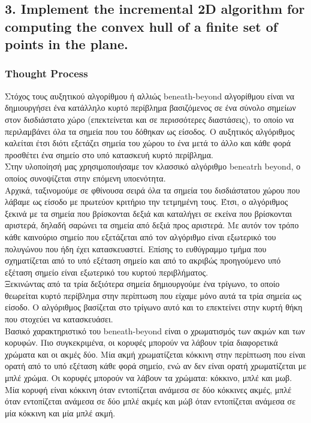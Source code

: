 \documentclass[12pt]{article}
\begin{document}
\pagebreak

\subsection*{3. Implement the incremental 2D algorithm for computing the convex hull of a
    finite set of points in the plane.}

\subsubsection*{Thought Process}

Στόχος τους αυξητικού αλγορίθμου ή αλλιώς beneath-beyond αλγορίθμου είναι να δημιουργήσει ένα κατάλληλο κυρτό περίβλημα βασιζόμενος σε ένα σύνολο σημείων στον δισδιάστατο χώρο (επεκτείνεται και σε περισσότερες διαστάσεις), το οποίο να περιλαμβάνει όλα τα σημεία που του δόθηκαν ως είσοδος. Ο αυξητικός αλγόριθμος καλείται έτσι διότι εξετάζει σημεία του χώρου το ένα μετά το άλλο και κάθε φορά προσθέτει ένα σημείο στο υπό κατασκευή κυρτό περίβλημα. \\

Στην υλοποίησή μας χρησιμοποιήσαμε τον κλασσικό αλγόριθμο beneatrh beyond, ο οποίος συνοψίζεται στην επόμενη υποενότητα. \\

Αρχικά, ταξινομούμε σε φθίνουσα σειρά όλα τα σημεία του δισδιάστατου χώρου που λάβαμε ως είσοδο με πρωτεύον κριτήριο την τετμημένη τους. Έτσι, ο αλγόριθμος ξεκινά με τα σημεία που βρίσκονται δεξιά και καταλήγει σε εκείνα που βρίσκονται αριστερά, δηλαδή σαρώνει τα σημεία από δεξιά προς αριστερά. Με αυτόν τον τρόπο κάθε καινούριο σημείο που εξετάζεται από τον αλγόριθμο είναι εξωτερικό του πολυγώνου που ήδη έχει κατασκευαστεί. Επίσης το ευθύγραμμο τμήμα που σχηματίζεται από το υπό εξέταση σημείο και από το ακριβώς προηγούμενο υπό εξέταση σημείο είναι εξωτερικό του κυρτού περιβλήματος. \\

Ξεκινώντας από τα τρία δεξιότερα σημεία δημιουργούμε ένα τρίγωνο, το οποίο θεωρείται κυρτό περίβλημα στην περίπτωση που είχαμε μόνο αυτά τα τρία σημεία ως είσοδο. Ο αλγόριθμος βασίζεται στο τρίγωνο αυτό και το επεκτείνει στην κυρτή θήκη που στοχεύει να κατασκευάσει. \\

Βασικό χαρακτηριστικό του beneath-beyond είναι ο χρωματισμός των ακμών και των κορυφών. Πιο συγκεκριμένα, οι κορυφές μπορούν να λάβουν τρία διαφορετικά χρώματα και οι ακμές δύο. Μία ακμή χρωματίζεται κόκκινη στην περίπτωση που είναι ορατή από το υπό εξέταση κάθε φορά σημείο, ενώ αν δεν είναι ορατή χρωματίζεται με μπλέ χρώμα. Οι κορυφές μπορούν να λάβουν τα χρώματα: κόκκινο, μπλέ και μωβ. Μία κορυφή είναι κόκκινη όταν εντοπίζεται ανάμεσα σε δύο κόκκινες ακμές, μπλέ όταν εντοπίζεται ανάμεσα σε δύο μπλέ ακμές και μώβ όταν εντοπίζεται ανάμεσα σε μία κόκκινη και μία μπλέ ακμή. \\
\end{document}
